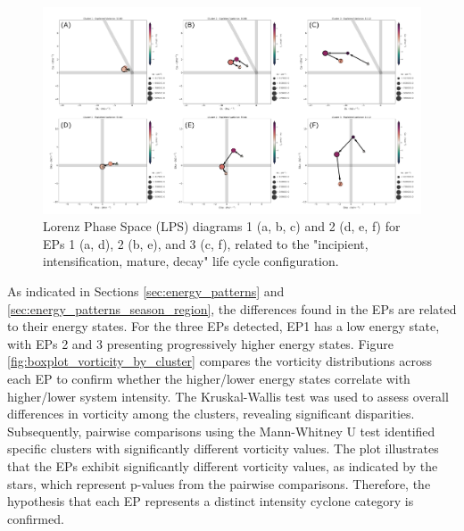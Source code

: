 \begin{figure}[!htbp]
\centering
\includegraphics[width=\textwidth]{figs_6/lps_energy_patterns_IcItDM.pdf}
\caption[Energy Patterns]{Lorenz Phase Space (LPS) diagrams 1 (a, b, c) and 2 (d, e, f) for EPs 1 (a, d), 2 (b, e), and 3 (c, f), related to the "incipient, intensification, mature, decay" life cycle configuration.}
\label{fig:lps_energy_patterns_IcItDM}
\end{figure}

As indicated in Sections \ref{sec:energy_patterns} and \ref{sec:energy_patterns_season_region}, the differences found in the EPs are related to their energy states. For the three EPs detected, EP1 has a low energy state, with EPs 2 and 3 presenting progressively higher energy states. Figure \ref{fig:boxplot_vorticity_by_cluster} compares the vorticity distributions across each EP to confirm whether the higher/lower energy states correlate with higher/lower system intensity. The Kruskal-Wallis test was used to assess overall differences in vorticity among the clusters, revealing significant disparities. Subsequently, pairwise comparisons using the Mann-Whitney U test identified specific clusters with significantly different vorticity values. The plot illustrates that the EPs exhibit significantly different vorticity values, as indicated by the stars, which represent p-values from the pairwise comparisons. Therefore, the hypothesis that each EP represents a distinct intensity cyclone category is confirmed.

